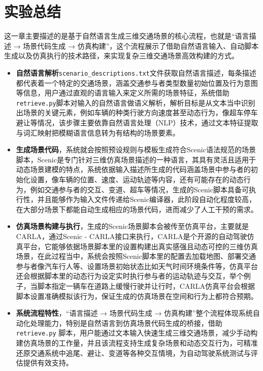 \section{实验总结}

这一章主要描述的是基于自然语言生成三维交通场景的核心流程，也就是“语言描述 → 场景代码生成 → 仿真构建”，这个流程展示了借助自然语言输入、自动脚本生成以及仿真执行的技术路径，来实现复杂三维交通场景高效构建的方式。

\begin{itemize}
	\item \textbf{自然语言解析}\texttt{scenario\_descriptions.txt}文件获取自然语言描述，每条描述都代表着一个特定的交通场景，涵盖交通参与者类型数量初始位置及行为意图等信息，用户通过直观的语言输入来定义所需的场景特征，系统借助\texttt{retrieve.py}脚本对输入的自然语言做语义解析，解析目标是从文本当中识别出场景的关键元素，例如车辆的种类行驶方向速度甚至动态行为，像超车停车避让等情况，该步骤主要依靠自然语言处理（NLP）技术，通过文本特征提取与词汇映射把模糊语言信息转为有结构的场景要素。
	
	\item \textbf{生成场景代码}，系统就会按照预设规则与模板生成符合Scenic语法规范的场景脚本，Scenic是专门针对三维仿真场景描述的一种语言，其具有灵活且适用于动态场景建模的特点，系统依据输入描述所生成的代码涵盖场景中参与者的初始化设置，像车辆的位置、速度、运动轨迹等内容，还有可能存在的动态行为，例如交通参与者的交互、变道、超车等情况，生成的Scenic脚本具备可执行性，并且能够作为输入文件传递给Scenic编译器，此阶段自动化程度较高，在大部分场景下都能自动生成相应的场景代码，进而减少了人工干预的需求。
	
	\item \textbf{仿真场景构建与执行}，生成的Scenic场景脚本会被传至仿真平台，主要就是CARLA，通过Scenic - CARLA接口来执行，CARLA是个开源的自动驾驶仿真平台，它能够依据场景脚本里的设置构建出真实感强且动态可控的三维仿真场景，在此过程当中，系统会按照Scenic脚本里的配置去加载地图、部署交通参与者像汽车行人等、设置场景初始状态比如天气时间环境条件等，仿真平台还会根据脚本里的动态行为设定实时执行参与者的运动轨迹与交互，举个例子，当脚本指定一辆车在道路上缓慢行驶并让行时，CARLA仿真平台会根据脚本设置准确模拟该行为，保证生成的仿真场景在空间和行为上都符合预期。
	
	\item \textbf{系统流程特性}，“语言描述 → 场景代码生成 → 仿真构建”整个流程体现系统自动化处理能力，特别是自然语言到仿真场景代码生成的桥接，借助 \texttt{retrieve.py} 脚本，用户能通过文本输入快速生成三维交通场景，减少手动构建仿真场景的工作量，并且该流程支持生成复杂场景和动态交互行为，可精准还原交通系统中追尾、避让、变道等各种交互情境，为自动驾驶系统测试与评估提供有效支持。
	
\end{itemize}
